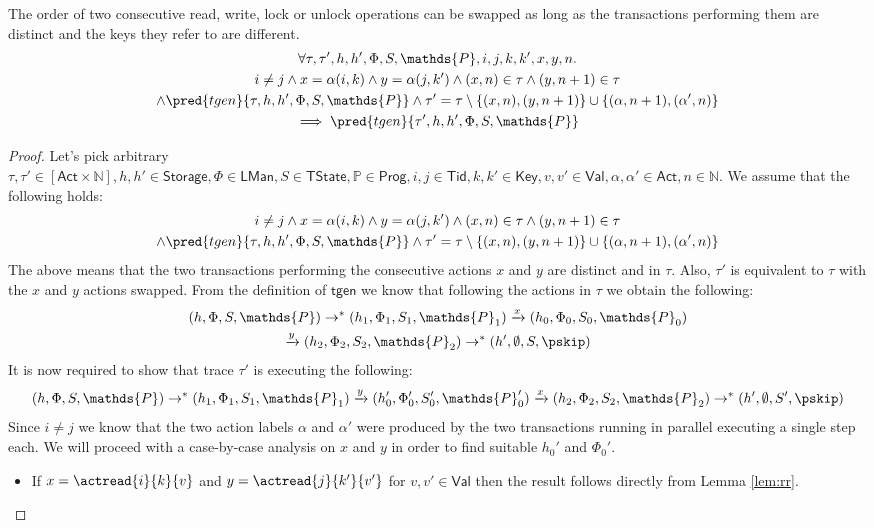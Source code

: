 \lem The order of two consecutive read, write, lock or unlock operations can be swapped as long as the transactions performing them are distinct and the keys they refer to are different.
\begin{gather*}
	\forall \tau, \tau', h, h', \Phi, S, \mathds{P}, i, j, k, k', x, y, n \ldotp \\
		i \neq j \land x = \alpha(i, k) \land y = \alpha(j, k') \land (x, n) \in \tau \land (y, n+1) \in \tau \\ \land \pred{tgen}{\tau, h, h', \Phi, S, \mathds{P}} \land \tau' = \tau \setminus \{(x, n), (y, n+1)\} \cup \{ (\alpha, n+1), (\alpha', n) \}
		\\	 
	 \implies \pred{tgen}{\tau', h, h', \Phi, S, \mathds{P}}
\end{gather*}
\begin{proof}
Let's pick arbitrary $\tau, \tau' \in [\mathsf{Act} \times \mathds{N}], h, h' \in \mathsf{Storage}, \Phi \in \mathsf{LMan}, S \in \mathsf{TState}, \mathds{P} \in \mathsf{Prog}, i, j \in \mathsf{Tid}, k, k' \in \mathsf{Key}, v, v' \in \mathsf{Val}, \alpha, \alpha' \in \mathsf{Act}, n \in \mathds{N}$. We assume that the following holds:
\begin{gather}
	i \neq j \land x = \alpha(i, k) \land y = \alpha(j, k') \land (x, n) \in \tau \land (y, n+1) \in \tau \\ \land \pred{tgen}{\tau, h, h', \Phi, S, \mathds{P}} \land \tau' = \tau \setminus \{(x, n), (y, n+1)\} \cup \{ (\alpha, n+1), (\alpha', n) \}
\end{gather}
The above means that the two transactions performing the consecutive actions $x$ and $y$ are distinct and in $\tau$. Also, $\tau'$ is equivalent to $\tau$ with the $x$ and $y$ actions swapped. From the definition of $\mathsf{tgen}$ we know that following the actions in $\tau$ we obtain the following:
\begin{gather}
	\label{lem:xy1} (h, \Phi, S, \mathds{P}) \rightarrow^* (h_1, \Phi_1, S_1, \mathds{P}_1) \xrightarrow{x} (h_0, \Phi_0, S_0, \mathds{P}_0) \\
	\label{lem:xy2} \xrightarrow{y} (h_2, \Phi_2, S_2, \mathds{P}_2) \rightarrow^* (h', \emptyset, S, \pskip)
\end{gather}
It is now required to show that trace $\tau'$ is executing the following:
\[
	(h, \Phi, S, \mathds{P}) \rightarrow^* (h_1, \Phi_1, S_1, \mathds{P}_1) \xrightarrow{y} (h_0', \Phi_0', S_0', \mathds{P}_0') \xrightarrow{x} (h_2, \Phi_2, S_2, \mathds{P}_2) \rightarrow^* (h', \emptyset, S', \pskip)
\]
Since $i \neq j$ we know that the two action labels $\alpha$ and $\alpha'$ were produced by the two transactions running in parallel executing a single step each. We will proceed with a case-by-case analysis on $x$ and $y$ in order to find suitable $h_0'$ and $\Phi_0'$.
\begin{itemize}
	\item If $x = \actread{i}{k}{v}$ and $y = \actread{j}{k'}{v'}$ for $v, v' \in \mathsf{Val}$ then the result follows directly from Lemma \ref{lem:rr}.
	

\end{itemize}
\end{proof}
